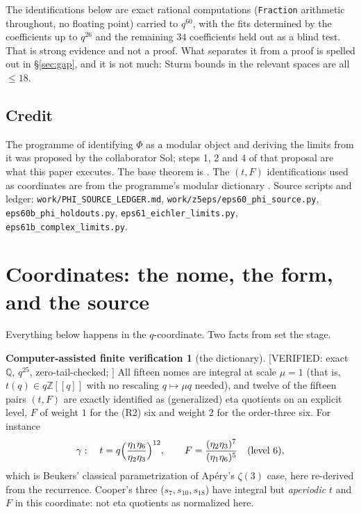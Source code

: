 \documentclass[11pt,reqno]{amsart}
\theoremstyle{plain}
\theoremstyle{definition}
\newtheorem{verification}[theorem]{Computer-assisted finite verification}
\theoremstyle{remark}
\newcommand{\Z}{\mathbb{Z}}
\newcommand{\Q}{\mathbb{Q}}
\newcommand{\VerifiedR}[1]{\textup{\textsf{[VERIFIED: #1]}}}
\begin{document}
The identifications below are exact rational computations
(\texttt{Fraction} arithmetic throughout, no floating point) carried to
$q^{60}$, with the fits determined by the coefficients up to $q^{26}$ and
the remaining $34$ coefficients held out as a blind test. That is strong
evidence and not a proof. What separates it from a proof is spelled out in
\S\ref{sec:gap}, and it is not much: Sturm bounds in the relevant spaces
are all $\le18$.

\subsection{Credit}
The programme of identifying $\Phi$ as a modular object and deriving the
limits from it was proposed by the collaborator Sol; steps 1, 2 and 4 of
that proposal are what this paper executes. The base theorem is
\cite{anchors}. The $(t,F)$ identifications used as coordinates are from
the programme's modular dictionary \cite{dict}. Source scripts and ledger:
\texttt{work/PHI\_SOURCE\_LEDGER.md},
\texttt{work/z5eps/eps60\_phi\_source.py},
\texttt{eps60b\_phi\_holdouts.py},
\texttt{eps61\_eichler\_limits.py},
\texttt{eps61b\_complex\_limits.py}.

\section{Coordinates: the nome, the form, and the source}
\label{sec:coords}

Everything below happens in the $q$-coordinate. Two facts from \cite{dict}
set the stage.

\begin{verification}[the dictionary]\label{ver:dict}
\VerifiedR{exact $\Q$, $q^{25}$, zero-tail-checked; \cite{dict}}
All fifteen nomes are integral at scale $\mu=1$ (that is, $t(q)\in q\Z[[q]]$
with no rescaling $q\mapsto\mu q$ needed), and twelve of the fifteen pairs
$(t,F)$ are exactly identified as (generalized) eta quotients on an explicit
level, $F$ of weight $1$ for the (R2) six and weight $2$ for the order-three
six. For instance
\[
\gamma:\quad t=q\Bigl(\frac{\eta_1\eta_6}{\eta_2\eta_3}\Bigr)^{12},\qquad
F=\frac{(\eta_2\eta_3)^7}{(\eta_1\eta_6)^5}\quad(\text{level }6),
\]
which is Beukers' classical parametrization of Ap\'ery's $\zeta(3)$ case,
here re-derived from the recurrence. Cooper's three ($s_7,s_{10},s_{18}$)
have integral but \emph{aperiodic} $t$ and $F$ in this coordinate: not eta
quotients as normalized here.
\end{verification}
\end{document}
